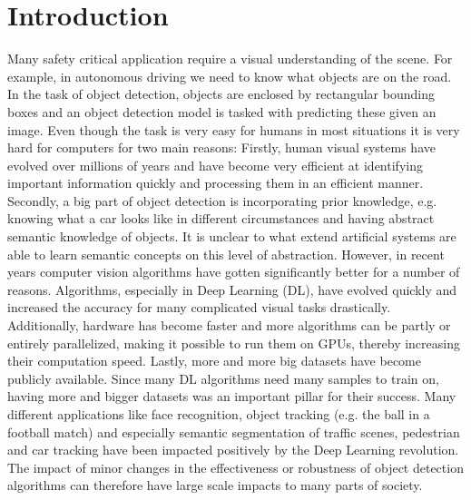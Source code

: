 \chapter{Introduction}
\label{chap:introduction}

Many safety critical application require a visual understanding of the scene. For example, in autonomous driving we need to know what objects are on the road. In the task of object detection, objects are enclosed by rectangular bounding boxes and an object detection model is tasked with predicting these given an image. Even though the task is very easy for humans in most situations it is very hard for computers for two main reasons: Firstly, human visual systems have evolved over millions of years and have become very efficient at identifying important information quickly and processing them in an efficient manner. Secondly, a big part of object detection is incorporating prior knowledge, e.g. knowing what a car looks like in different circumstances and having abstract semantic knowledge of objects. It is unclear to what extend artificial systems are able to learn semantic concepts on this level of abstraction. However, in recent years computer vision algorithms have gotten significantly better for a number of reasons. Algorithms, especially in Deep Learning (DL), have evolved quickly and increased the accuracy for many complicated visual tasks drastically. Additionally, hardware has become faster and more algorithms can be partly or entirely parallelized, making it possible to run them on GPUs, thereby increasing their computation speed. Lastly, more and more big datasets have become publicly available. Since many DL algorithms need many samples to train on, having more and bigger datasets was an important pillar for their success.
Many different applications like face recognition, object tracking (e.g. the ball in a football match) and especially semantic segmentation of traffic scenes, pedestrian and car tracking have been impacted positively by the Deep Learning revolution. The impact of minor changes in the effectiveness or robustness of object detection algorithms can therefore have large scale impacts to many parts of society. \\

